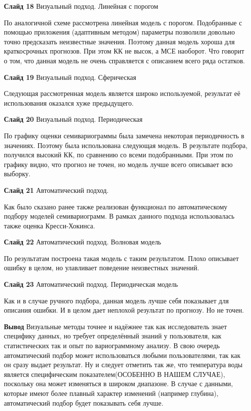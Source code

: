 \documentclass[a4paper,10pt]{report}
\begin{document}
\textbf{Слайд 18} Визуальный подход. Линейная с порогом

По аналогичной схеме рассмотрена линейная модель с порогом. Подобранные с помощью приложения (адаптивным методом) параметры позволили довольно точно предсказать неизвестные значения. Поэтому данная модель хороша для краткосрочных прогнозов. При этом КК не высок, а МСЕ наоборот. Что говорит о том, что данная модель не очень справляется с описанием всего ряда остатков.

\textbf{Слайд 19} Визуальный подход. Сферическая

Следующая рассмотренная модель является широко используемой, результат её использования оказался хуже предыдущего.

\textbf{Слайд 20} Визуальный подход. Периодическая

По графику оценки семивариограммы была замечена некоторая периодичность в значениях. Поэтому была использована следующая модель. В результате подбора, получился высокий КК, по сравнению со всеми подобранными. При этом по графику видно, что прогноз не точен, но модель лучше всего описывает всю выборку.

\textbf{Слайд 21} Автоматический подход.

Как было сказано ранее также реализован функционал по автоматическому подбору моделей семивариограмм. В рамках данного подхода использовалась также оценка Кресси-Хокинса.

\textbf{Слайд 22} Автоматический подход. Волновая модель

По результатам построена такая модель с таким результатом. Плохо описывает ошибку в целом, но улавливает поведение неизвестных значений.

\textbf{Слайд 23} Автоматический подход. Периодическая модель

Как и в случае ручного подбора, данная модель лучше себя показывает для описания ошибки. И в целом дает неплохой результат по прогнозу. Но не точен.

\textbf{Вывод} Визуальные методы точнее и надёжнее так как исследователь знает специфику данных, но требует определённый знаний у пользователя, как статистических так и опыт по вариограммному анализу. В свою очередь автоматический подбор может использоваться любыми пользователями, так как он сразу выдает результат. Ну и следует отметить так же, что температура воды является специфическим показателем(ОСОБЕННО В НАШЕМ СЛУЧАЕ), поскольку она может изменяться в широком диапазоне. В случае с данными, которые имеют более плавный характер изменений (например глубина), автоматический подбор будет показывать себя лучше.
\end{document}
